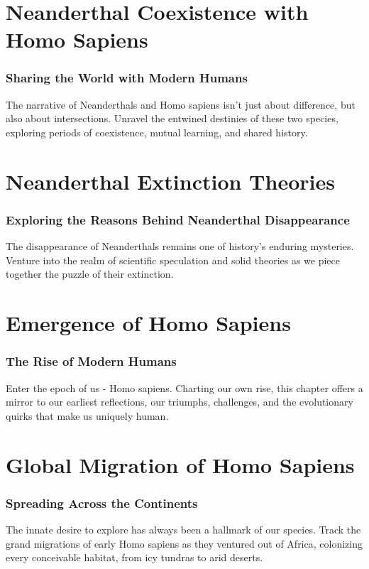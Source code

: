 \documentclass[a4paper,12pt]{book}
\begin{document}
\chapter{Neanderthal Coexistence with Homo Sapiens}
\subsection*{Sharing the World with Modern Humans}
The narrative of Neanderthals and Homo sapiens isn't just about difference, but also about intersections. Unravel the entwined destinies of these two species, exploring periods of coexistence, mutual learning, and shared history.

\chapter{Neanderthal Extinction Theories}
\subsection*{Exploring the Reasons Behind Neanderthal Disappearance}
The disappearance of Neanderthals remains one of history's enduring mysteries. Venture into the realm of scientific speculation and solid theories as we piece together the puzzle of their extinction.

\chapter{Emergence of Homo Sapiens}
\subsection*{The Rise of Modern Humans}
Enter the epoch of us - Homo sapiens. Charting our own rise, this chapter offers a mirror to our earliest reflections, our triumphs, challenges, and the evolutionary quirks that make us uniquely human.

\chapter{Global Migration of Homo Sapiens}
\subsection*{Spreading Across the Continents}
The innate desire to explore has always been a hallmark of our species. Track the grand migrations of early Homo sapiens as they ventured out of Africa, colonizing every conceivable habitat, from icy tundras to arid deserts.
\end{document}
